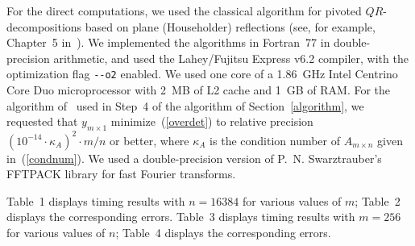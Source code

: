\documentclass[letterpaper,12pt]{article}
\begin{document}
For the direct computations, we used the classical algorithm
for pivoted $QR$-de\-com\-po\-si\-tions
based on plane (Householder) reflections
(see, for example, Chapter~5 in~\cite{golub-van_loan}).
We implemented the algorithms in Fortran~77 in double-precision arithmetic,
and used the Lahey/Fujitsu Express v6.2 compiler,
with the optimization flag {\tt -{}-o2} enabled.
We used one core of a 1.86~GHz Intel Centrino Core Duo microprocessor
with 2~MB of L2 cache and 1~GB of RAM.
For the algorithm of~\cite{rokhlin-tygert} used in Step~4
of the algorithm of Section~\ref{algorithm},
we requested that $y_{m \times 1}$ minimize~(\ref{overdet})
to relative precision $(10^{-14} \cdot \kappa_A)^2 \cdot m/n$ or better,
where $\kappa_A$ is the condition number of $A_{m \times n}$
given in~(\ref{condnum}).
We used a double-precision version of P.~N. Swarztrauber's FFTPACK library
for fast Fourier transforms.

Table~1 displays timing results with $n = 16384$ for various values of $m$;
Table~2 displays the corresponding errors.
Table~3 displays timing results with $m = 256$ for various values of $n$;
Table~4 displays the corresponding errors.
\end{document}

